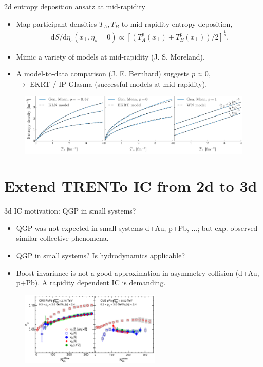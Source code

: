 \documentclass[11pt]{beamer}
\begin{document}
\begin{frame}{2d entropy deposition ansatz at mid-rapidity}
\begin{itemize}
\item Map participant densities $T_A, T_B$ to mid-rapidity entropy deposition,
\begin{eqnarray}
\nonumber
\mathrm{d}S/\mathrm{d}\eta_s(x_\perp, \eta_s = 0) \propto  \left[\left(T_A^p(x_\perp) + T_B^p(x_\perp)\right)/2\right]^{\frac{1}{p}}.
\end{eqnarray}
\item {\color{red} Mimic a variety of models at mid-rapidity} (J. S. Moreland).
\item A model-to-data comparison (J. E. Bernhard) suggests $p \approx 0$,\\
$\rightarrow$ EKRT / IP-Glasma (successful models at mid-rapidity).
\end{itemize}
\vspace{0.5em}
\begin{center}
\begin{figure}
\includegraphics[width=\textwidth]{./pics/cgc_compare.pdf}
\end{figure}
\end{center}
\end{frame}

\section{Extend TRENTo IC from 2d to 3d}
\begin{frame}{3d IC motivation: QGP in small systems?}
\begin{itemize}
\item QGP was not expected in small systems  d+Au, p+Pb, ...; but exp. observed similar collective phenomena.
\item QGP in small systems? Is hydrodynamics applicable?
\item Boost-invariance is not a good approximation in asymmetry collision (d+Au, p+Pb). \color{red} A rapidity dependent IC is demanding.
\end{itemize}
\begin{center}
\begin{figure}
\includegraphics[width=0.6\textwidth]{./pics/small.png}
\end{figure}
\end{center}
\end{frame}
\end{document}
